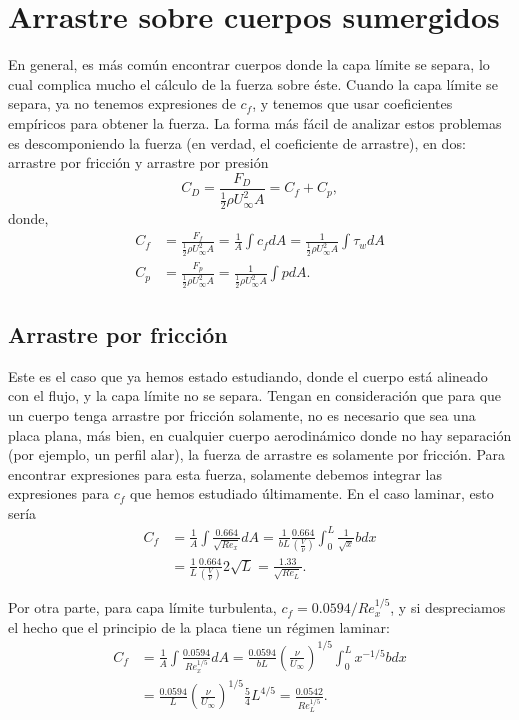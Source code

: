 \section*{Arrastre sobre cuerpos sumergidos}

En general, es más común encontrar cuerpos donde la capa límite se separa, lo cual complica mucho el cálculo de la fuerza sobre éste.
Cuando la capa límite se separa, ya no tenemos expresiones de $c_f$, y tenemos que usar coeficientes empíricos para obtener la fuerza.
La forma más fácil de analizar estos problemas es descomponiendo la fuerza (en verdad, el coeficiente de arrastre), en dos: arrastre por fricción y arrastre por presión
%
\begin{equation}
C_D = \frac{F_D}{\frac{1}{2}\rho U_\infty^2 A} = C_f + C_p,
\end{equation}
%
donde,
%
\begin{align}\label{eq:CfCp}
C_f & = \frac{F_f}{\frac{1}{2}\rho U_\infty^2 A}= \frac{1}{A}\int c_f dA = \frac{1}{\frac{1}{2}\rho U_\infty^2 A}\int\tau_wdA\nonumber\\
C_p & = \frac{F_p}{\frac{1}{2}\rho U_\infty^2 A}= \frac{1}{\frac{1}{2}\rho U_\infty^2 A}\int p dA.
\end{align}

\subsection*{Arrastre por fricción}
Este es el caso que ya hemos estado estudiando, donde el cuerpo está alineado con el flujo, y la capa límite no se separa.
Tengan en consideración que para que un cuerpo tenga arrastre por fricción solamente, no es necesario que sea una placa plana, más bien, en cualquier cuerpo aerodinámico donde no hay separación (por ejemplo, un perfil alar), la fuerza de arrastre es solamente por fricción.
Para encontrar expresiones para esta fuerza, solamente debemos integrar las expresiones para $c_f$ que hemos estudiado últimamente.
En el caso laminar, esto sería
%
\begin{align}
C_f &= \frac{1}{A}\int\frac{0.664}{\sqrt{Re_x}}dA = \frac{1}{bL} \frac{0.664}{\left(\frac{V}{\nu}\right)}\int_0^L \frac{1}{\sqrt{x}} b dx \nonumber\\
&= \frac{1}{L} \frac{0.664}{\left(\frac{V}{\nu}\right)} 2\sqrt{L} = \frac{1.33}{\sqrt{Re_L}}.
\end{align}

Por otra parte, para capa límite turbulenta, $c_f=0.0594/Re_x^{1/5}$, y si despreciamos el hecho que el principio de la placa tiene un régimen laminar:
%
\begin{align}\label{eq:Cf_turb}
C_f &= \frac{1}{A}\int\frac{0.0594}{Re_x^{1/5}}dA = \frac{0.0594}{bL}\left(\frac{\nu}{U_\infty}\right)^{1/5}\int_0^Lx^{-1/5}bdx \nonumber\\
&=\frac{0.0594}{L}\left(\frac{\nu}{U_\infty}\right)^{1/5}\frac{5}{4}L^{4/5} = \frac{0.0542}{Re_L^{1/5}}.
\end{align}

